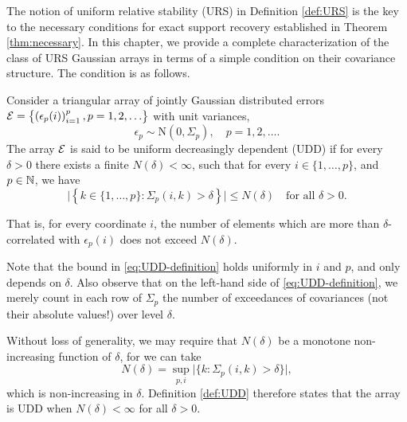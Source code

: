 
The notion of uniform relative stability (URS) in Definition \ref{def:URS} is the key to the necessary conditions for exact support recovery established in Theorem \ref{thm:necessary}.
In this chapter, we provide a complete characterization of the class of URS Gaussian arrays in terms of a simple condition on their covariance structure.
The condition is as follows.



\begin{definition} \label{def:UDD}
Consider a triangular array of jointly Gaussian distributed errors 
${\cal E} = \left\{\left(\epsilon_p(i)\right)_{i=1}^p, p = 1,2,\ldots\right\}$ 
with unit variances,
$$
\epsilon_p \sim \text{N}(0, \Sigma_p), \quad p=1,2,\ldots.
$$
The array ${\cal E}$ is said to be uniform decreasingly dependent (UDD) if 
for every $\delta>0$ there exists a finite $N(\delta)<\infty$, such that for every $i\in\{1,\ldots,p\}$, and $p\in\mathbb N$, we have
\begin{equation} \label{eq:UDD-definition}
    \Big|\left\{k\in\{1,\ldots,p\}:\Sigma_p(i,k)>\delta\right\}\Big| \le N(\delta)\quad \text{for all  } \delta>0.
\end{equation}
\end{definition}
That is, for every coordinate $i$, the number of elements which are more than $\delta$-correlated with $\epsilon_p(i)$ does not exceed $N(\delta)$. 

Note that the bound in \eqref{eq:UDD-definition} holds uniformly in $i$ and $p$, and only depends on $\delta$.
Also observe that on the left-hand side of \eqref{eq:UDD-definition}, we merely count in each row of $\Sigma_p$ the number of exceedances of covariances (not their absolute values!) over level $\delta$.

\begin{remark} \label{rmk:choice-of-N(delta)}
Without loss of generality, we may require that $N(\delta)$ be a monotone non-increasing function of $\delta$, for we can take
$$
N(\delta) = \sup_{p,i} \Big|\{k:\Sigma_p(i,k)>\delta\}\Big|,
$$
which is non-increasing in $\delta$.
Definition \ref{def:UDD} therefore states that the array is UDD when $N(\delta)<\infty$ for all $\delta>0$.
\end{remark}


